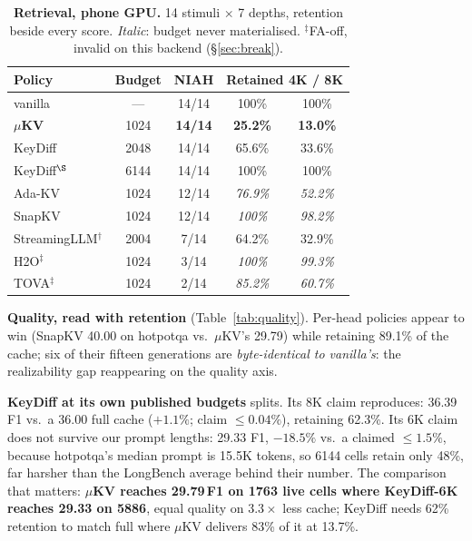 \documentclass[sigconf,10pt]{acmart}
\begin{document}
\begin{table}[t]
\caption{\textbf{Retrieval, phone GPU.} 14 stimuli $\times$ 7 depths, retention beside every score. \emph{Italic}: budget never materialised. $^{\ddagger}$FA-off, invalid on this backend (\S\ref{sec:break}).}
\label{tab:niah}
\small
\setlength{\tabcolsep}{5pt}
\begin{tabular}{lcccc}
\toprule
\textbf{Policy} & \textbf{Budget} & \textbf{NIAH} & \multicolumn{2}{c}{\textbf{Retained 4K / 8K}} \\
\midrule
vanilla                & ---  & 14/14 & 100\% & 100\% \\
\textbf{$\mu$KV}       & 1024 & \textbf{14/14} & \textbf{25.2\%} & \textbf{13.0\%} \\
KeyDiff                & 2048 & 14/14 & 65.6\% & 33.6\% \\
KeyDiff$^{\S}$         & 6144 & 14/14 & 100\% & 100\% \\
Ada-KV                 & 1024 & 12/14 & \textit{76.9\%} & \textit{52.2\%} \\
SnapKV                 & 1024 & 12/14 & \textit{100\%} & \textit{98.2\%} \\
StreamingLLM$^\dagger$ & 2004 & 7/14 & 64.2\% & 32.9\% \\
H2O$^{\ddagger}$       & 1024 & 3/14 & \textit{100\%} & \textit{99.3\%} \\
TOVA$^{\ddagger}$      & 1024 & 2/14 & \textit{85.2\%} & \textit{60.7\%} \\
\bottomrule
\end{tabular}
\end{table}

\textbf{Quality, read with retention} (Table~\ref{tab:quality}). Per-head policies appear to win (SnapKV 40.00 on hotpotqa vs.\ $\mu$KV's 29.79) while retaining 89.1\% of the cache; six of their fifteen generations are \emph{byte-identical to vanilla's}: the realizability gap reappearing on the quality axis.

\textbf{KeyDiff at its own published budgets} splits. Its 8K claim reproduces: 36.39 F1 vs.\ a 36.00 full cache ($+1.1\%$; claim $\le0.04\%$), retaining 62.3\%. Its 6K claim does not survive our prompt lengths: 29.33 F1, $-18.5\%$ vs.\ a claimed $\le1.5\%$, because hotpotqa's median prompt is 15.5K tokens, so 6144 cells retain only 48\%, far harsher than the LongBench average behind their number. The comparison that matters: \textbf{$\mu$KV reaches 29.79\,F1 on 1763 live cells where KeyDiff-6K reaches 29.33 on 5886}, equal quality on $3.3\times$ less cache; KeyDiff needs 62\% retention to match full where $\mu$KV delivers 83\% of it at 13.7\%.
\end{document}
